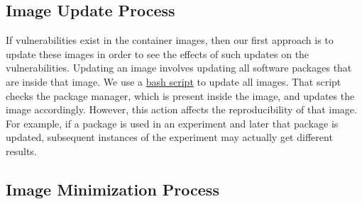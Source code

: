 \documentclass[a4paper,num-refs]{oup-contemporary}
\begin{document}
\subsection{Image Update Process}

If vulnerabilities exist in the container images, then our first approach
is to update these images in order to see the effects of such updates
on the vulnerabilities.
Updating an image involves updating all software packages that are
inside that image. We use a 
\href{https://github.com/kaurbhupinder/Vulnerability-Analysis/blob/master/Scripts/update/update.sh}{bash script} 
to update all images. That script checks the
package manager, which is present inside the image, and updates the image
accordingly. However, this action affects the reproducibility
of that image. For example, if a package is used in an experiment
and later that package is updated, subsequent instances of the experiment may actually
get different results.
\vspace*{-2mm}
\subsection{Image Minimization Process}
\end{document}
